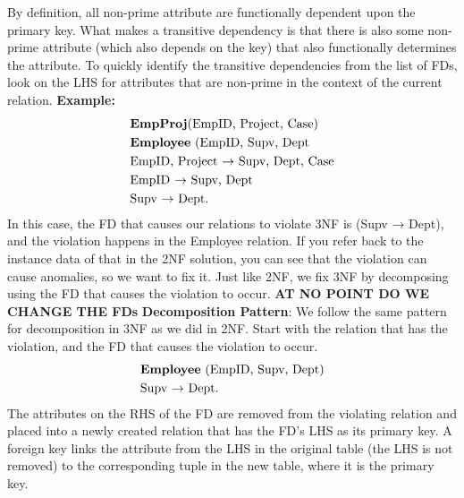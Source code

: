 \documentclass{report}
\begin{document}
\begin{itemize}
            \bigbreak \noindent 
            By definition, all non-prime attribute are functionally dependent upon the primary key. What makes a transitive dependency is that there is also some non-prime attribute (which also depends on the key) that also functionally determines the attribute.
            \bigbreak \noindent 
            To quickly identify the transitive dependencies from the list of FDs, look on the LHS for attributes that are non-prime in the context of the current relation.
            \bigbreak \noindent 
            \textbf{Example:}
            \begin{align*}
                &\text{\textbf{EmpProj}(EmpID, Project, Case)} \\
                &\text{\textbf{Employee} (EmpID, Supv, Dept} \\
                &\text{EmpID, Project $\to$ Supv, Dept, Case} \\
                &\text{EmpID $\to$ Supv, Dept} \\
                &\text{Supv $\to$ Dept}
            .\end{align*}
            \bigbreak \noindent 
            In this case, the FD that causes our relations to violate 3NF is (Supv → Dept), and the violation happens in the
            Employee relation. If you refer back to the instance data of that in the 2NF solution, you can see that the
            violation can cause anomalies, so we want to fix it.
            \bigbreak \noindent 
            Just like 2NF, we fix 3NF by decomposing using the FD that causes the violation to occur. \textbf{AT NO POINT DO WE CHANGE THE FDs}
            \bigbreak \noindent 
            \textbf{Decomposition Pattern}: We follow the same pattern for decomposition in 3NF as we did in 2NF. Start with the relation that has the violation, and the FD that causes the violation to occur.
            \begin{align*}
                &\text{\textbf{Employee} (EmpID, Supv, Dept)} \\
                &\text{Supv $\to$ Dept}
            .\end{align*}
            \bigbreak \noindent 
            The attributes on the RHS of the FD are removed from the violating relation and placed into a newly created
            relation that has the FD’s LHS as its primary key. A foreign key links the attribute from the LHS in the original table
            (the LHS is not removed) to the corresponding tuple in the new table, where it is the primary key.
            \begin{align*}

\end{align*}
\end{itemize}
\end{document}
